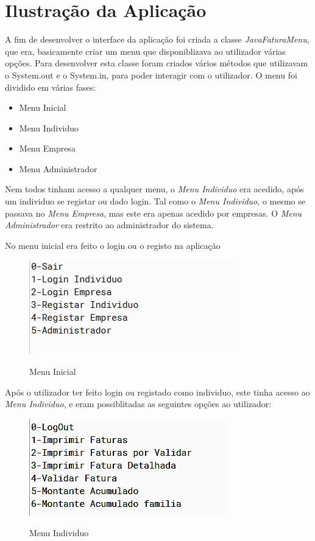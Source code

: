 \documentclass[10pt, a4paper]{report}
\begin{document}
\chapter{Ilustração da Aplicação}

A fim de desenvolver o interface da aplicação foi criada a classe \emph{JavaFaturaMenu}, que era, basicamente criar um menu que disponiblizava ao utilizador várias opções.
Para desenvolver esta classe foram criados vários métodos que utilizavam o System.out e o System.in, para poder interagir com o utilizador.
O menu foi dividido em várias fases:

\begin{itemize}
	\item Menu Inicial
	\item Menu Individuo
	\item Menu Empresa
	\item Menu Administrador
\end{itemize}

Nem todos tinham acesso a qualquer menu, o \emph{Menu Individuo} era acedido, após um individuo se registar ou dado login.
Tal como o \emph{Menu Individuo}, o mesmo se passava no \emph{Menu Empresa}, mas este era apenas acedido por empresas.
O \emph{Menu Administrador} era restrito ao administrador do sistema.

No menu inicial era feito o login ou o registo na aplicação

\begin{figure}[h]
\caption{Menu Inicial}
\centering
\includegraphics{Menu}
\label{menu0}
\end{figure}

Após o utilizador ter feito login ou registado como individuo, este tinha acesso ao \emph{Menu Individuo}, e eram possiblitadas as seguintes opções ao utilizador:

\begin{figure}[h]
\caption{Menu Individuo}
\centering
\includegraphics{Individuo}
\label{menu1}
\end{figure}
\end{document}
